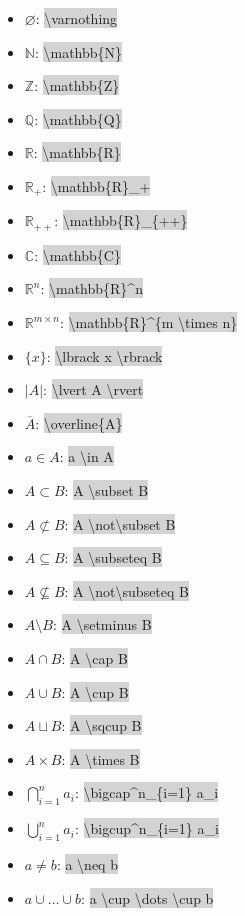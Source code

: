 \documentclass[12pt]{article}
\theoremstyle{definition}
\newcommand{\RR}{\mathbb{R}}
\newcommand{\QQ}{\mathbb{Q}}
\newcommand{\NN}{\mathbb{N}}
\newcommand{\CC}{\mathbb{C}}
\newcommand{\ltc}[1]{\colorbox{lightgray}{\textbackslash #1}}
\newcommand{\ltcc}[1]{\colorbox{lightgray}{#1}}
\newcommand{\bras}[1]{\lbrace #1 \rbrace}
\begin{document}
 	\begin{multicols}{2}
 	\begin{itemize}
	 	\item $\varnothing$: \ltc{varnothing}
 		\item $\NN$: \ltc{mathbb\{N\}}
 		\item $\mathbb{Z}$: \ltc{mathbb\{Z\}}
 		\item $\QQ$: \ltc{mathbb\{Q\}}
 		\item $\RR$: \ltc{mathbb\{R\}}
 		\item $\RR_+$: \ltc{mathbb\{R\}\_+}
 		\item $\RR_{++}$: \ltc{mathbb\{R\}\_\{++\}}
 		\item $\CC$: \ltc{mathbb\{C\}}
 		\item $\RR^n$: \ltc{mathbb\{R\}\^{}n}
 		\item $\RR^{m \times n}$: \ltc{mathbb\{R\}\^{}\{m \textbackslash times n\}}
 		\item $\bras{x}$: \ltc{lbrack x \textbackslash rbrack}
 		\item $|A|$: \ltcc{\textbackslash lvert A \textbackslash rvert}
 		\item $\overline{A}$: \ltc{overline\{A\}}
 		\item $a \in A$: \ltcc{a \textbackslash in A}
 		\item $A \subset B$: \ltcc{A \textbackslash subset B}
 		\item $A \not\subset B$: \ltcc{A \textbackslash not\textbackslash subset B}
 		\item $A \subseteq B$: \ltcc{A \textbackslash subseteq B}
 		\item $A \not\subseteq B$: \ltcc{A \textbackslash not\textbackslash subseteq B}
 		\item $A \setminus B$: \ltcc{A \textbackslash setminus B}
 		\item $A \cap B$: \ltcc{A \textbackslash cap B}
 		\item $A \cup B$: \ltcc{A \textbackslash cup B}
 		\item $A \sqcup B$: \ltcc{A \textbackslash sqcup B}
 		\item $A \times B$: \ltcc{A \textbackslash times B}
 		\item $\bigcap^n_{i=1} a_i$: \ltc{bigcap\^{}n\_\{i=1\} a\_i}
 		\item $\bigcup^n_{i=1} a_i$: \ltc{bigcup\^{}n\_\{i=1\} a\_i}
 		\item $a \neq b$: \ltcc{a \textbackslash neq b}
 		\item $a \cup \dots \cup b$: \ltcc{a \textbackslash cup \textbackslash dots \textbackslash cup b}
 	\end{itemize}	
 	\end{multicols}
\end{document}
